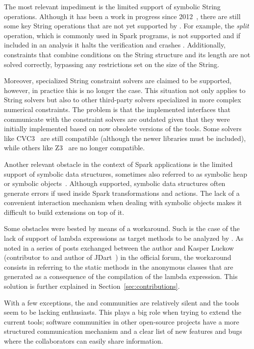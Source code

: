 The most relevant impediment is the limited support of symbolic String operations. Although it has been a work in progress since 2012~\cite{Redelinghuys2012,Pasareanu2013}, there are still some key String operations that are not yet supported by \spf{}. For example, the \textit{split} operation, which is commonly used in Spark programs, is not supported and if included in an analysis it halts the verification and crashes \jpf{}. Additionally, constraints that combine conditions on the String structure and its length are not solved correctly, bypassing any restrictions set on the size of the String.

Moreover, specialized String constraint solvers are claimed to be supported, however, in practice this is no longer the case. This situation not only applies to String solvers but also to other third-party solvers specialized in more complex numerical constraints. The problem is that the implemented interfaces that communicate with the constraint solvers are outdated given that they were initially implemented based on now obsolete versions of the tools. Some solvers like CVC3~\cite{Barrett2007} are still compatible (although the newer libraries must be included), while others like Z3~\cite{DeMoura2008} are no longer compatible.

Another relevant obstacle in the context of Spark applications is the limited support of symbolic data structures, sometimes also referred to as symbolic heap or symbolic objects~\cite{Pasareanu2010}. Although supported, symbolic data structures often generate errors if used inside Spark transformations and actions. The lack of a convenient interaction mechanism when dealing with symbolic objects makes it difficult to build extensions on top of it.

Some obstacles were bested by means of a workaround. Such is the case of the lack of support of lambda expressions as target methods to be analyzed by \spf{}. As noted in a series of posts exchanged between the author and Kasper Luckow (contributor to \spf{} and author of JDart~\cite{Luckow2016}) in the official \jpf{} forum, the workaround consists in referring to the static methods in the anonymous classes that are generated as a consequence of the compilation of the lambda expression. This solution is further explained in Section~\ref{sec:contributions}.

With a few exceptions, the \jpf{} and \spf{} communities are relatively silent and the tools seem to be lacking enthusiasts. This plays a big role when trying to extend the current tools; software communities in other open-source projects have a more structured communication mechanism and a clear list of new features and bugs where the collaborators can easily share information.

